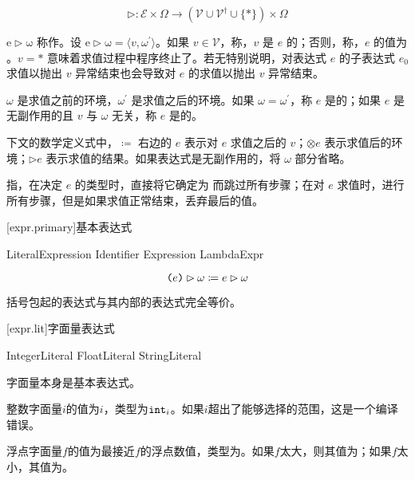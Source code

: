 $$ \mathrm{\rhd}: \mathcal{E} \times \Omega \rightarrow (\mathcal{V} \cup \mathcal{V}^\dag \cup \{\ast\}) \times \Omega $$

\pnum
$\mathrm{e \rhd \omega}$ 称作。设 $\mathrm{e \rhd \omega} = \langle v, \omega^\prime \rangle$。如果 $v \in \mathcal{V}$，称，$v$ 是 $e$ 的；否则，称，$e$ 的值为 。$v = \ast$ 意味着求值过程中程序终止了。若无特别说明，对表达式 $e$ 的子表达式 $e_0$ 求值以抛出 $v$ 异常结束也会导致对 $e$ 的求值以抛出 $v$ 异常结束。

\pnum
$\omega$ 是求值之前的环境，$\omega^\prime$ 是求值之后的环境。如果 $\omega = \omega^\prime$，称 $e$ 是的；如果 $e$ 是无副作用的且 $v$ 与 $\omega$ 无关，称 $e$ 是的。

\pnum
下文的数学定义式中，$\coloneqq$ 右边的 $e$ 表示对 $e$ 求值之后的 $v$；$\otimes e$ 表示求值后的环境；$\rhd e$ 表示求值的结果。如果表达式是无副作用的，将 $\omega$ 部分省略。

\pnum
{}指，在决定 $e$ 的类型时，直接将它确定为  而跳过所有步骤；在对 $e$ 求值时，进行所有步骤，但是如果求值正常结束，丢弃最后的值。

[expr.primary]{基本表达式}

\begin{bnf}
 \br
    LiteralExpression \br
    Identifier \br
    \terminal{(} Expression \terminal{)} \br
    LambdaExpr
\end{bnf}

$$ \texttt{(}e\texttt{)} \rhd \omega \coloneqq e \rhd \omega $$

\pnum
括号包起的表达式与其内部的表达式完全等价。

[expr.lit]{字面量表达式}

\begin{bnf}
 \br
    IntegerLiteral \br
    FloatLiteral \br
    StringLiteral \br
     \br
     \br
\end{bnf}

\pnum
字面量本身是基本表达式。

\pnum
整数字面量$i$的值为$i$，类型为$\texttt{int}_i$。如果$i$超出了能够选择的范围，这是一个编译错误。

\pnum
浮点字面量$f$的值为最接近$f$的浮点数值，类型为。如果$f$太大，则其值为；如果$f$太小，其值为。

